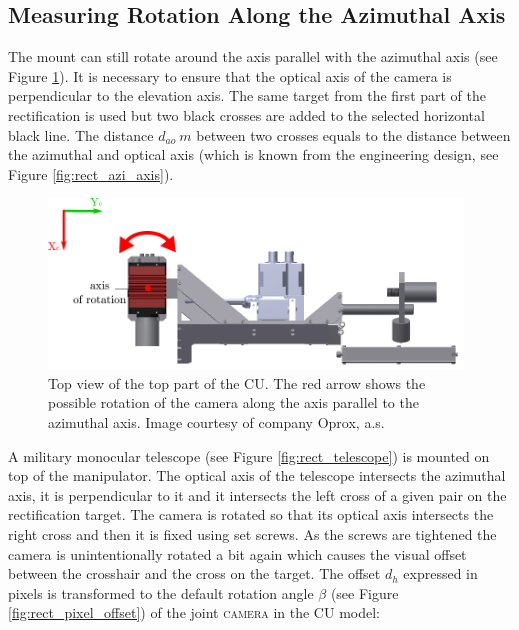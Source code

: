 \subsection{Measuring Rotation Along the Azimuthal Axis}

The mount can still rotate around the axis parallel with the azimuthal axis (see Figure \ref{fig:rect_model_top_view}). It is necessary to ensure that the optical axis of the camera is perpendicular to the elevation axis. The same target from the first part of the rectification is used but two black crosses are added to the selected horizontal black line. The distance $d_{ao}\ m$ between two crosses equals to the distance between the azimuthal and optical axis (which is known from the engineering design, see Figure \ref{fig:rect_azi_axis}).

\begin{figure}[htb]
	\centering
	\includegraphics[width=11cm]{fig/rect_model_top_view.pdf}
	\caption{Top view of the top part of the CU. The red arrow shows the possible rotation of the camera along the axis parallel to the azimuthal axis. Image courtesy of company Oprox, a.s.}
	\label{fig:rect_model_top_view}
\end{figure}

A military monocular telescope (see Figure \ref{fig:rect_telescope}) is mounted on top of the manipulator. The optical axis of the telescope intersects the azimuthal axis, it is perpendicular to it and it intersects the left cross of a given pair on the rectification target. The camera is rotated so that its optical axis intersects the right cross and then it is fixed using set screws. As the screws are tightened the camera is unintentionally rotated a bit again which causes the visual offset between the crosshair and the cross on the target. The offset $d_{h}$ expressed in pixels is transformed to the default rotation angle $\beta$ (see Figure \ref{fig:rect_pixel_offset}) of the joint \textsc{camera} in the CU model:

